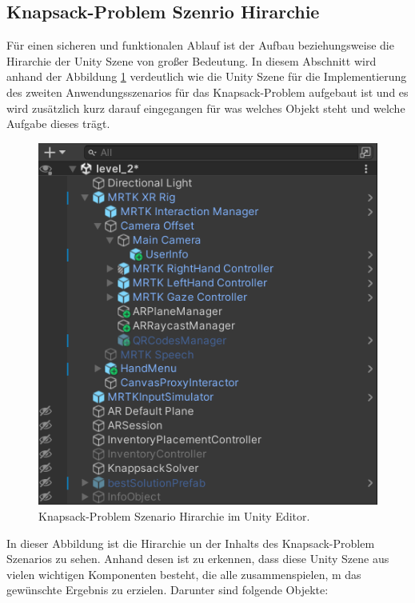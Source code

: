 \subsection{Knapsack-Problem Szenrio Hirarchie} 
Für einen sicheren und funktionalen Ablauf ist der Aufbau beziehungsweise die Hirarchie der Unity Szene von großer Bedeutung.
In diesem Abschnitt wird anhand der Abbildung \ref{fig:level2_hierarchy} verdeutlich wie die Unity Szene für die Implementierung
des zweiten Anwendungsszenarios für das Knapsack-Problem aufgebaut ist und es wird zusätzlich kurz darauf eingegangen
für was welches Objekt steht und welche Aufgabe dieses trägt.
\\
\begin{figure}[H]
    \centering
    \includegraphics[scale=0.8]{images/Level2Hirarchy}
    \caption{Knapsack-Problem Szenario Hirarchie im Unity Editor.}
    \label{fig:level2_hierarchy}
\end{figure}
In dieser Abbildung ist die Hirarchie un der Inhalts des Knapsack-Problem Szenarios zu sehen. Anhand desen ist zu erkennen,
dass diese Unity Szene aus vielen wichtigen Komponenten besteht, die alle zusammenspielen, m das gewünschte Ergebnis
zu erzielen. Darunter sind folgende Objekte:

